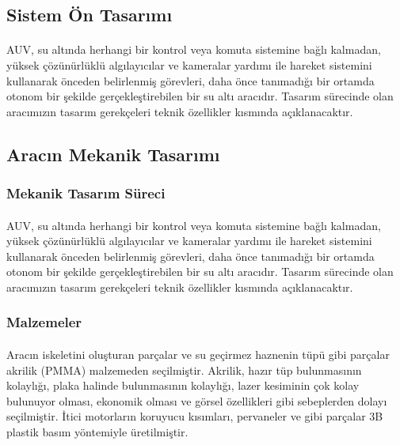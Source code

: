 \documentclass[12pt]{article}
\begin{document}
\subsection{Sistem Ön Tasarımı}

\begin{justify}
\paragraph{} AUV, su altında herhangi bir kontrol veya komuta sistemine bağlı kalmadan, yüksek çözünürlüklü algılayıcılar ve kameralar yardımı ile hareket sistemini kullanarak önceden belirlenmiş görevleri, daha önce tanımadığı bir ortamda otonom bir şekilde gerçekleştirebilen bir su altı aracıdır. Tasarım sürecinde olan aracımızın tasarım gerekçeleri teknik özellikler kısmında açıklanacaktır.
\end{justify}

\subsection{Aracın Mekanik Tasarımı}

\subsubsection{Mekanik Tasarım Süreci}

\begin{justify}
\paragraph{} AUV, su altında herhangi bir kontrol veya komuta sistemine bağlı kalmadan, yüksek çözünürlüklü algılayıcılar ve kameralar yardımı ile hareket sistemini kullanarak önceden belirlenmiş görevleri, daha önce tanımadığı bir ortamda otonom bir şekilde gerçekleştirebilen bir su altı aracıdır. Tasarım sürecinde olan aracımızın tasarım gerekçeleri teknik özellikler kısmında açıklanacaktır.
\end{justify}

\subsubsection{Malzemeler}

\begin{justify}
\paragraph{} Aracın iskeletini oluşturan parçalar ve su geçirmez haznenin tüpü gibi parçalar akrilik (PMMA) malzemeden seçilmiştir. Akrilik, hazır tüp bulunmasının kolaylığı, plaka halinde bulunmasının kolaylığı, lazer kesiminin çok kolay bulunuyor olması, ekonomik olması ve görsel özellikleri gibi sebeplerden dolayı seçilmiştir. İtici motorların koruyucu kısımları, pervaneler ve  gibi parçalar 3B plastik basım yöntemiyle üretilmiştir. 
\end{justify}
\end{document}
